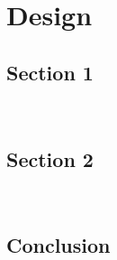 

\chapter{Design}
\label{chap:design}

\lipsum[11]

\minitoc
\newpage

\section{Section 1}

\lipsum[12] \\ \lipsum[15]

\section{Section 2}

\lipsum[14] \\ \lipsum[15]

\section{Conclusion}

\lipsum[16]
